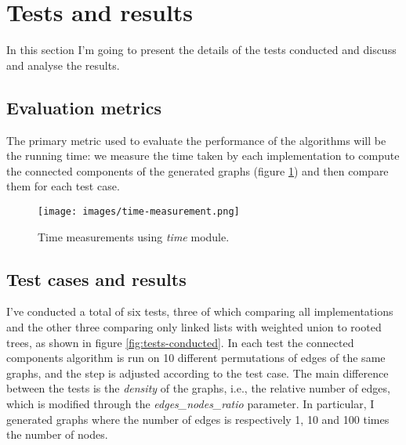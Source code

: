 \documentclass[11pt]{article}
\begin{document}
    \section{Tests and results}
    In this section I'm going to present the details of the tests conducted and discuss and analyse the results.
    \subsection{Evaluation metrics}
    The primary metric used to evaluate the performance of the algorithms will be the running time: we measure the time taken by each implementation to compute the connected components of the generated graphs (figure \ref{fig:time-measurement}) and then compare them for each test case.

    \begin{figure}[H]
        \centering
        \texttt{[image: images/time-measurement.png]}
        \caption{Time measurements using \textit{time} module.}
        \label{fig:time-measurement}
    \end{figure}

    \subsection{Test cases and results}
    I've conducted a total of six tests, three of which comparing all implementations and the other three comparing only linked lists with weighted union to rooted trees, as shown in figure \ref{fig:tests-conducted}. In each test the connected components algorithm is run on 10 different permutations of edges of the same graphs, and the step is adjusted according to the test case. The main difference between the tests is the \textit{density} of the graphs, i.e., the relative number of edges, which is modified through the \textit{edges\_nodes\_ratio} parameter. In particular, I generated graphs where the number of edges is respectively 1, 10 and 100 times the number of nodes.
\end{document}
